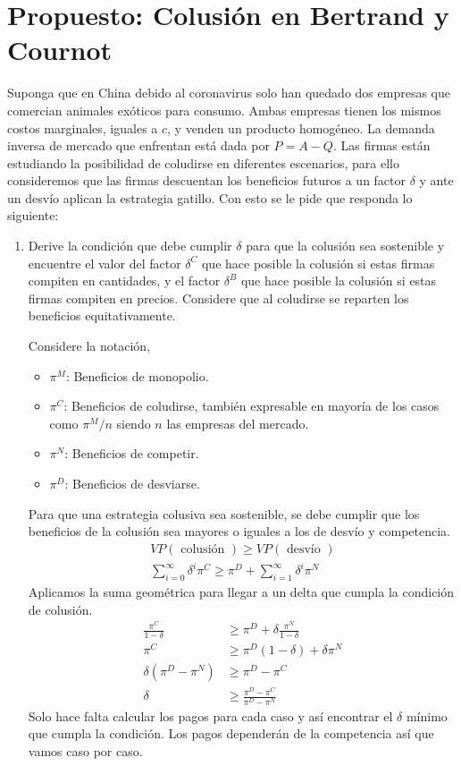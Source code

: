 \documentclass{exam}
\begin{document}
\section{Propuesto: Colusión en Bertrand y Cournot}
Suponga que en China debido al coronavirus solo han quedado dos empresas que comercian animales exóticos para consumo. Ambas empresas tienen los mismos costos marginales, iguales a $c$, y venden un producto homogéneo. La demanda inversa de mercado que enfrentan está dada por $P=A-Q$. Las firmas están estudiando la posibilidad de coludirse en diferentes escenarios, para ello consideremos que las firmas descuentan los beneficios futuros a un factor $\delta$ y ante un desvío aplican la estrategia gatillo. Con esto se le pide que responda lo siguiente:

\begin{enumerate}
  \item Derive la condición que debe cumplir $\delta$ para que la colusión sea sostenible y encuentre el valor del factor $\delta^{C}$ que hace posible la colusión si estas firmas compiten en cantidades, y el factor $\delta^{B}$ que hace posible la colusión si estas firmas compiten en precios. Considere que al coludirse se reparten los beneficios equitativamente.
  \begin{solution}
    Considere la notación,
    \begin{itemize}
        \item $\pi^M$: Beneficios de monopolio.
        \item $\pi^C$: Beneficios de coludirse, también expresable en mayoría de los casos como $\pi^M/n$ siendo $n$ las empresas del mercado. 
        \item $\pi^N$: Beneficios de competir.
        \item $\pi^D$: Beneficios de desviarse.
    \end{itemize}
    Para que una estrategia colusiva sea sostenible, se debe cumplir que los beneficios de la colusión sea mayores o iguales a los de desvío y competencia.
    \begin{align*}
        VP(\text { colusión }) \geq VP(\text { desvío }) \\
        \sum_{i=0}^{\infty} \delta^{i} \pi^{C} \geq \pi^{D}+\sum_{i=1}^{\infty} \delta^{i} \pi^{N}
    \end{align*}
    Aplicamos la suma geométrica para llegar a un delta que cumpla la condición de colusión.
    \begin{align*}
        \frac{\pi^{C}}{1-\delta} &\geq \pi^{D}+\delta \frac{\pi^{N}}{1-\delta} \\
        \pi^{C} &\geq \pi^{D}(1-\delta)+\delta \pi^{N} \\
        \delta\left(\pi^{D}-\pi^{N}\right) &\geq \pi^{D}-\pi^{C} \\
        \delta &\geq \frac{\pi^{D}-\pi^{C}}{\pi^{D}-\pi^{N}}
    \end{align*}
    Solo hace falta calcular los pagos para cada caso y así encontrar el $\delta$ mínimo que cumpla la condición. Los pagos dependerán de la competencia así que vamos caso por caso.


\end{solution}
\end{enumerate}
\end{document}
